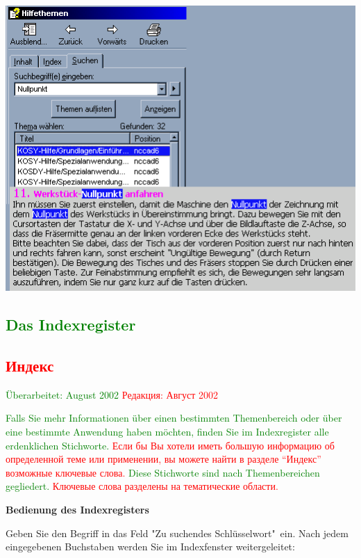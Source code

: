 \documentclass[14pt,a4paper]{book}
\newcommand{\DE}[1]{\textcolor{green}{#1}}
\newcommand{\RU}[1]{\textcolor{red}{#1}}
\begin{document}
\includegraphics{pic/Suche1.png}


\DE{\chapter{Das Indexregister}}
\RU{\chapter{Индекс}}

\DE{Überarbeitet: August 2002}
\RU{Редакция: Август 2002}

\bigskip

\DE{Falls Sie mehr Informationen über einen bestimmten Themenbereich oder über
eine bestimmte Anwendung haben möchten, finden Sie im Indexregister alle
erdenklichen Stichworte.}
\RU{Если бы Вы хотели иметь большую информацию об определенной теме или
применении, вы можете найти в разделе ``Индекс'' возможные ключевые слова.}
\DE{Diese Stichworte sind nach Themenbereichen
gegliedert.}
\RU{Ключевые слова разделены на тематические области.}

\bigskip

\textbf{Bedienung des Indexregisters}

\bigskip

Geben Sie den Begriff in das Feld "Zu suchendes Schlüsselwort"\ ein. 
Nach jedem
eingegebenen Buchstaben werden Sie im Indexfenster weitergeleitet:
\end{document}
